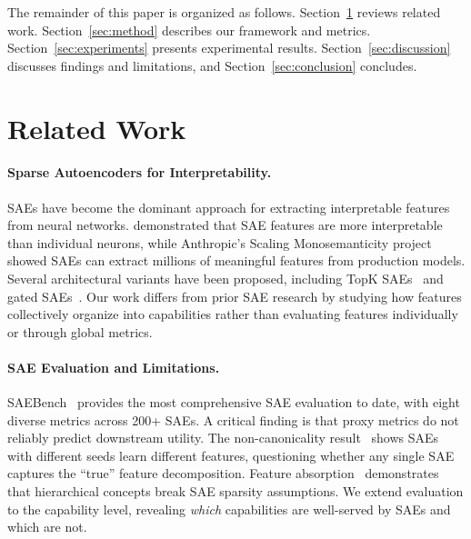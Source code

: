 \documentclass{article}
\begin{document}
The remainder of this paper is organized as follows. Section~\ref{sec:related} reviews related work. Section~\ref{sec:method} describes our framework and metrics. Section~\ref{sec:experiments} presents experimental results. Section~\ref{sec:discussion} discusses findings and limitations, and Section~\ref{sec:conclusion} concludes.

\section{Related Work}
\label{sec:related}

\paragraph{Sparse Autoencoders for Interpretability.}
SAEs have become the dominant approach for extracting interpretable features from neural networks. \citet{cunningham2024sparse} demonstrated that SAE features are more interpretable than individual neurons, while Anthropic's Scaling Monosemanticity project~\citep{templeton2024scaling} showed SAEs can extract millions of meaningful features from production models. Several architectural variants have been proposed, including TopK SAEs~\citep{gao2024scaling} and gated SAEs~\citep{rajamanoharan2024improving}. Our work differs from prior SAE research by studying how features collectively organize into capabilities rather than evaluating features individually or through global metrics.

\paragraph{SAE Evaluation and Limitations.}
SAEBench~\citep{karvonen2025saebench} provides the most comprehensive SAE evaluation to date, with eight diverse metrics across 200+ SAEs. A critical finding is that proxy metrics do not reliably predict downstream utility. The non-canonicality result~\citep{leask2025sparse} shows SAEs with different seeds learn different features, questioning whether any single SAE captures the ``true'' feature decomposition. Feature absorption~\citep{chanin2025absorption} demonstrates that hierarchical concepts break SAE sparsity assumptions. We extend evaluation to the capability level, revealing \emph{which} capabilities are well-served by SAEs and which are not.
\end{document}
